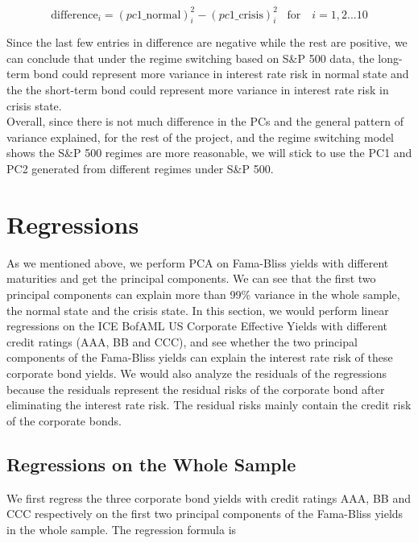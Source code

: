 \documentclass[12pt]{article}
\begin{document}
$$\textrm{difference}_i=(pc1\_\textrm{normal})_i^2-(pc1\_\textrm{crisis})_i^2 \,\,\,\,\,\textrm{for}\,\,\,\,\,\, i=1,2...10$$ 

Since the last few entries in difference are negative while the rest are positive, we can conclude that under the regime switching based on S\&P 500 data, the long-term bond could represent more variance in interest rate risk in normal state and the the short-term bond could represent more variance in interest rate risk in crisis state.\\


Overall, since there is not much difference in the PCs and the general pattern of variance explained, for the rest of the project, and the regime switching model shows the S\&P 500 regimes are more reasonable, we will stick to use the PC1 and PC2 generated from different regimes under S\&P 500. \\




\pagestyle{fancyplain}
\cfoot{}

\section{Regressions}

As we mentioned above, we perform PCA on Fama-Bliss yields with different maturities and get the principal components. We can see that the first two principal components can explain more than 99\% variance in the whole sample, the normal state and the crisis state. In this section, we would perform linear regressions on the ICE BofAML US Corporate Effective Yields with different credit ratings (AAA, BB and CCC), and see whether the two principal components of the Fama-Bliss yields can explain the interest rate risk of these corporate bond yields. We would also analyze the residuals of the regressions because the residuals represent the residual risks of the corporate bond after eliminating the interest rate risk. The residual risks mainly contain the credit risk of the corporate bonds.

\subsection{Regressions on the Whole Sample}

We first regress the three corporate bond yields with credit ratings AAA, BB and CCC respectively on the first two principal components of the Fama-Bliss yields in the whole sample. The regression formula is
\end{document}
